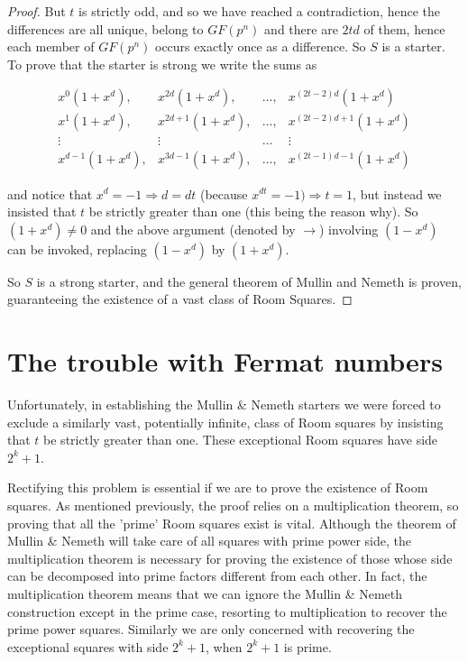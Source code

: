 \documentclass[
  11pt,
  a4paper]{book}
\begin{document}
\begin{proof}
But $t$ is strictly odd, and so we have reached a
contradiction, hence the differences are all unique, belong
to $GF(p^n)$ and there are $2td$ of them, hence each member
of $GF(p^n)$ occurs exactly once as a difference. So $S$ is
a starter.  To prove that the starter is strong we write the
sums as

\begin{equation*}
  \begin{array}{cccc}
    x^0(1 + x^d), & x^{2d}(1 + x^d), & \ldots, & x^{(2t - 2)d}(1 + x^d) \\
    x^1(1 + x^d), & x^{2d + 1}(1 + x^d), & \ldots, & x^{(2t - 2)d + 1}(1 + x^d) \\
    \vdots & \vdots & \ldots & \vdots \\
    x^{d - 1}(1 + x^d), & x^{3d - 1}(1 + x^d), & \ldots, & x^{(2t - 1)d - 1}(1 + x^d)
  \end{array}
\end{equation*}

and notice that $x^d = -1 \Rightarrow d = dt$ (because
$x^{dt} = -1) \Rightarrow t = 1$, but instead we insisted that
$t$ be strictly greater than one (this being the reason
why). So $(1 + x^d) \neq 0$ and the above argument (denoted by
$\rightarrow$) involving $(1 - x^d)$ can be invoked, replacing
$(1 - x^d)$ by $(1 + x^d)$.

So $S$ is a strong starter, and the general theorem of
Mullin and Nemeth is proven, guaranteeing the existence of a
vast class of Room Squares.
\end{proof}

\hypertarget{the-trouble-with-fermat-numbers}{%
\section{The trouble with Fermat numbers}\label{the-trouble-with-fermat-numbers}}

Unfortunately, in establishing the Mullin \& Nemeth starters
we were forced to exclude a similarly vast, potentially
infinite, class of Room squares by insisting that \(t\) be
strictly greater than one. These exceptional Room squares
have side \(2^k + 1\).

Rectifying this problem is essential if we are to prove the
existence of Room squares. As mentioned previously, the
proof relies on a multiplication theorem, so proving that
all the 'prime' Room squares exist is vital. Although the
theorem of Mullin \& Nemeth will take care of all squares
with prime power side, the multiplication theorem is
necessary for proving the existence of those whose side can
be decomposed into prime factors different from each other.
In fact, the multiplication theorem means that we can ignore
the Mullin \& Nemeth construction except in the prime case,
resorting to multiplication to recover the prime power
squares. Similarly we are only concerned with recovering the
exceptional squares with side \(2^k + 1\), when \(2^k + 1\) is
prime.
\end{document}
